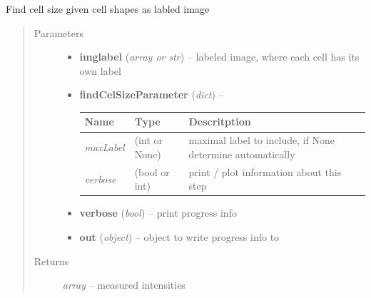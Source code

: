 \documentclass[letterpaper,10pt,english]{sphinxmanual}
\begin{document}
\begin{fulllineitems}
\label{api/ClearMap.ImageProcessing:ClearMap.ImageProcessing.CellSizeDetection.findCellSize}
Find cell size given cell shapes as labled image
\begin{quote}\begin{description}
\item[{Parameters}] \leavevmode\begin{itemize}
\item {} 
\textbf{imglabel} (\emph{array or str}) --
labeled image, where each cell has its own label

\item {} 
\textbf{findCelSizeParameter} (\emph{dict}) --

\begin{tabulary}{\linewidth}{|L|L|L|}
\hline
\textsf{\relax 
Name
} & \textsf{\relax 
Type
} & \textsf{\relax 
Descritption
}\\
\hline
\emph{maxLabel}
 & 
(int or None)
 & 
maximal label to include, if None determine automatically
\\
\hline
\emph{verbose}
 & 
(bool or int)
 & 
print / plot information about this step
\\
\hline\end{tabulary}


\item {} 
\textbf{verbose} (\emph{bool}) --
print progress info

\item {} 
\textbf{out} (\emph{object}) --
object to write progress info to

\end{itemize}

\item[{Returns}] \leavevmode
\emph{array} --
measured intensities

\end{description}\end{quote}

\end{fulllineitems}

\end{document}
